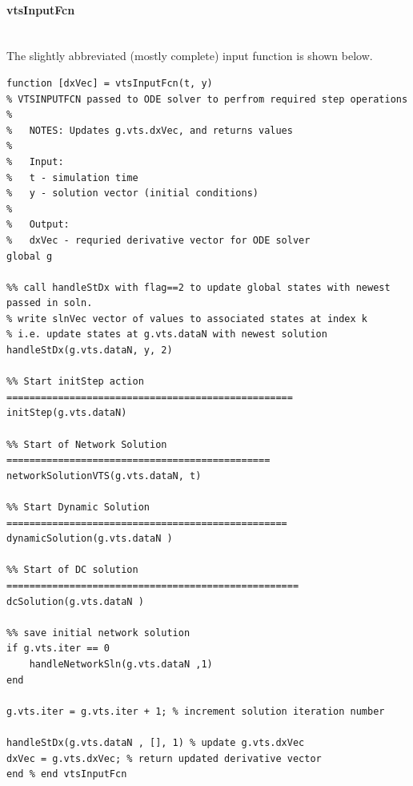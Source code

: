 \documentclass[12pt]{article}
\begin{document}
\pagebreak
\paragraph{vtsInputFcn} \ \\
The slightly abbreviated (mostly complete) input function is shown below.
\begin{verbatim}
function [dxVec] = vtsInputFcn(t, y)
% VTSINPUTFCN passed to ODE solver to perfrom required step operations
%
%   NOTES: Updates g.vts.dxVec, and returns values
%
%   Input:
%   t - simulation time
%   y - solution vector (initial conditions)
%
%   Output:
%   dxVec - requried derivative vector for ODE solver
global g

%% call handleStDx with flag==2 to update global states with newest passed in soln.
% write slnVec vector of values to associated states at index k
% i.e. update states at g.vts.dataN with newest solution
handleStDx(g.vts.dataN, y, 2)

%% Start initStep action ==================================================
initStep(g.vts.dataN)

%% Start of Network Solution ==============================================
networkSolutionVTS(g.vts.dataN, t)

%% Start Dynamic Solution =================================================
dynamicSolution(g.vts.dataN )

%% Start of DC solution ===================================================
dcSolution(g.vts.dataN )

%% save initial network solution
if g.vts.iter == 0
    handleNetworkSln(g.vts.dataN ,1)
end

g.vts.iter = g.vts.iter + 1; % increment solution iteration number

handleStDx(g.vts.dataN , [], 1) % update g.vts.dxVec
dxVec = g.vts.dxVec; % return updated derivative vector
end % end vtsInputFcn
\end{verbatim}

\pagebreak
\end{document}
